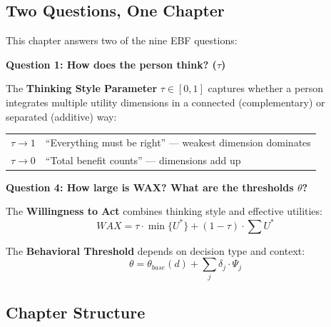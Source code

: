 \subsection{Two Questions, One Chapter}
\label{subsec:12-1-two-questions}

This chapter answers two of the nine EBF questions:

\begin{tcolorbox}[
  colback=white,
  colframe=blue!50!black,
  title={\textbf{Questions Addressed in This Chapter}},
  fonttitle=\bfseries\sffamily
]

\textbf{Question 1: How does the person think? ($\tau$)}

The \textbf{Thinking Style Parameter} $\tau \in [0,1]$ captures whether 
a person integrates multiple utility dimensions in a connected (complementary) 
or separated (additive) way:

\begin{center}
\begin{tabular}{lp{8cm}}
$\tau \to 1$ & ``Everything must be right'' — weakest dimension dominates\\
$\tau \to 0$ & ``Total benefit counts'' — dimensions add up\\
\end{tabular}
\end{center}

\vspace{6pt}
\textbf{Question 4: How large is WAX? What are the thresholds $\theta$?}

The \textbf{Willingness to Act} combines thinking style and effective utilities:
\begin{equation*}
WAX = \tau \cdot \min\{U^*\} + (1-\tau) \cdot \sum U^*
\end{equation*}

The \textbf{Behavioral Threshold} depends on decision type and context:
\begin{equation*}
\theta = \theta_{base}(d) + \sum_j \delta_j \cdot \Psi_j
\end{equation*}

\end{tcolorbox}

\subsection{Chapter Structure}
\label{subsec:12-1-structure}


